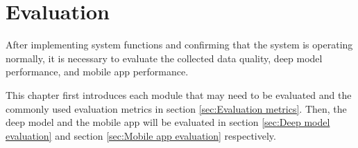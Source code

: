 \chapter{Evaluation}
\label{chap:Evaluation}
After implementing system functions and confirming that the system is operating normally, it is necessary to evaluate the collected data quality, deep model performance, and mobile app performance.

This chapter first introduces each module that may need to be evaluated and the commonly used evaluation metrics in section \ref{sec:Evaluation metrics}.
Then, the deep model and the mobile app will be evaluated in section \ref{sec:Deep model evaluation} and section \ref{sec:Mobile app evaluation} respectively.



